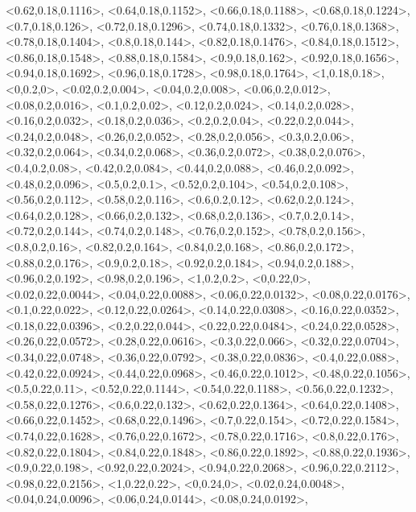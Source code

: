 \documentclass[a4paper,10pt]{article}
\begin{document}
\begin{eulernotebook}
\begin{euleroutput}
  <0.62,0.18,0.1116>,
  <0.64,0.18,0.1152>,
  <0.66,0.18,0.1188>,
  <0.68,0.18,0.1224>,
  <0.7,0.18,0.126>,
  <0.72,0.18,0.1296>,
  <0.74,0.18,0.1332>,
  <0.76,0.18,0.1368>,
  <0.78,0.18,0.1404>,
  <0.8,0.18,0.144>,
  <0.82,0.18,0.1476>,
  <0.84,0.18,0.1512>,
  <0.86,0.18,0.1548>,
  <0.88,0.18,0.1584>,
  <0.9,0.18,0.162>,
  <0.92,0.18,0.1656>,
  <0.94,0.18,0.1692>,
  <0.96,0.18,0.1728>,
  <0.98,0.18,0.1764>,
  <1,0.18,0.18>,
  <0,0.2,0>,
  <0.02,0.2,0.004>,
  <0.04,0.2,0.008>,
  <0.06,0.2,0.012>,
  <0.08,0.2,0.016>,
  <0.1,0.2,0.02>,
  <0.12,0.2,0.024>,
  <0.14,0.2,0.028>,
  <0.16,0.2,0.032>,
  <0.18,0.2,0.036>,
  <0.2,0.2,0.04>,
  <0.22,0.2,0.044>,
  <0.24,0.2,0.048>,
  <0.26,0.2,0.052>,
  <0.28,0.2,0.056>,
  <0.3,0.2,0.06>,
  <0.32,0.2,0.064>,
  <0.34,0.2,0.068>,
  <0.36,0.2,0.072>,
  <0.38,0.2,0.076>,
  <0.4,0.2,0.08>,
  <0.42,0.2,0.084>,
  <0.44,0.2,0.088>,
  <0.46,0.2,0.092>,
  <0.48,0.2,0.096>,
  <0.5,0.2,0.1>,
  <0.52,0.2,0.104>,
  <0.54,0.2,0.108>,
  <0.56,0.2,0.112>,
  <0.58,0.2,0.116>,
  <0.6,0.2,0.12>,
  <0.62,0.2,0.124>,
  <0.64,0.2,0.128>,
  <0.66,0.2,0.132>,
  <0.68,0.2,0.136>,
  <0.7,0.2,0.14>,
  <0.72,0.2,0.144>,
  <0.74,0.2,0.148>,
  <0.76,0.2,0.152>,
  <0.78,0.2,0.156>,
  <0.8,0.2,0.16>,
  <0.82,0.2,0.164>,
  <0.84,0.2,0.168>,
  <0.86,0.2,0.172>,
  <0.88,0.2,0.176>,
  <0.9,0.2,0.18>,
  <0.92,0.2,0.184>,
  <0.94,0.2,0.188>,
  <0.96,0.2,0.192>,
  <0.98,0.2,0.196>,
  <1,0.2,0.2>,
  <0,0.22,0>,
  <0.02,0.22,0.0044>,
  <0.04,0.22,0.0088>,
  <0.06,0.22,0.0132>,
  <0.08,0.22,0.0176>,
  <0.1,0.22,0.022>,
  <0.12,0.22,0.0264>,
  <0.14,0.22,0.0308>,
  <0.16,0.22,0.0352>,
  <0.18,0.22,0.0396>,
  <0.2,0.22,0.044>,
  <0.22,0.22,0.0484>,
  <0.24,0.22,0.0528>,
  <0.26,0.22,0.0572>,
  <0.28,0.22,0.0616>,
  <0.3,0.22,0.066>,
  <0.32,0.22,0.0704>,
  <0.34,0.22,0.0748>,
  <0.36,0.22,0.0792>,
  <0.38,0.22,0.0836>,
  <0.4,0.22,0.088>,
  <0.42,0.22,0.0924>,
  <0.44,0.22,0.0968>,
  <0.46,0.22,0.1012>,
  <0.48,0.22,0.1056>,
  <0.5,0.22,0.11>,
  <0.52,0.22,0.1144>,
  <0.54,0.22,0.1188>,
  <0.56,0.22,0.1232>,
  <0.58,0.22,0.1276>,
  <0.6,0.22,0.132>,
  <0.62,0.22,0.1364>,
  <0.64,0.22,0.1408>,
  <0.66,0.22,0.1452>,
  <0.68,0.22,0.1496>,
  <0.7,0.22,0.154>,
  <0.72,0.22,0.1584>,
  <0.74,0.22,0.1628>,
  <0.76,0.22,0.1672>,
  <0.78,0.22,0.1716>,
  <0.8,0.22,0.176>,
  <0.82,0.22,0.1804>,
  <0.84,0.22,0.1848>,
  <0.86,0.22,0.1892>,
  <0.88,0.22,0.1936>,
  <0.9,0.22,0.198>,
  <0.92,0.22,0.2024>,
  <0.94,0.22,0.2068>,
  <0.96,0.22,0.2112>,
  <0.98,0.22,0.2156>,
  <1,0.22,0.22>,
  <0,0.24,0>,
  <0.02,0.24,0.0048>,
  <0.04,0.24,0.0096>,
  <0.06,0.24,0.0144>,
  <0.08,0.24,0.0192>,

\end{euleroutput}
\end{eulernotebook}
\end{document}
